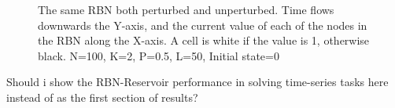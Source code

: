 \begin{figure}
  \caption{
    The same RBN both perturbed and unperturbed.
    Time flows downwards the Y-axis,
    and the current value of each of the nodes in the RBN along the X-axis.
    A cell is white if the value is 1, otherwise black.
    N=100, K=2, P=0.5, L=50, Initial state=0
  }
\end{figure}

Should i show the RBN-Reservoir performance in solving time-series tasks here instead of as the first section of results?
